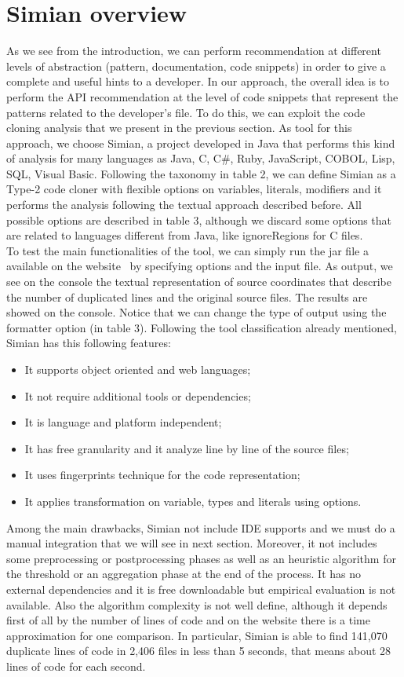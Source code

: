 \section{Simian overview}
As we see from the introduction, we can perform recommendation at different levels of abstraction (pattern, documentation, code snippets) in order to give a complete and useful hints to a developer. In our approach, the overall idea is to perform the API recommendation at the level of code snippets that represent the patterns related to the developer's file. To do this, we can exploit the code cloning analysis that we present in the previous section. As tool for this approach, we choose Simian, a project developed in Java that performs this kind of analysis for many languages as Java, C, C\#, Ruby, JavaScript, COBOL, Lisp, SQL, Visual Basic. Following the taxonomy in table 2, we can define Simian as a Type-2 code cloner with flexible options on variables, literals, modifiers and it performs the analysis following the textual approach described before. All possible options are described in table 3, although we discard some options that are related to languages different from Java, like ignoreRegions for C files. \\
To test the main functionalities of the tool, we can simply run the jar file a available on the website~\cite{https://www.harukizaemon.com/simian/_last_nodate} by specifying options and the input file. As output, we see on the console the textual representation of source coordinates that describe the number of duplicated lines and the original source files. The results are showed on the console. Notice that we can change the type of output using the formatter option (in table 3). 
Following the tool classification already mentioned, Simian has this following features: 
\begin{itemize}
\item It supports object oriented and web languages;
\item It not require additional tools or dependencies;
\item It is language and platform independent;
\item It has free granularity and it analyze line by line of the source files;
\item It uses fingerprints technique for the code representation;
\item It applies transformation on variable, types and literals using options.
\end{itemize}
Among the main drawbacks, Simian not include IDE supports and we must do a manual integration that we will see in next section. Moreover, it not includes some preprocessing or postprocessing phases as well as an heuristic algorithm for the threshold or an aggregation phase at the end of the process. It has no external dependencies and it is free downloadable but empirical evaluation is not available. Also the algorithm complexity is not well define, although it depends first of all by the number of lines of code and on the website there is a time approximation for one comparison. In particular, Simian is able to find 141,070 duplicate lines of code in 2,406 files in less than 5 seconds, that means about 28 lines of code for each second. 



